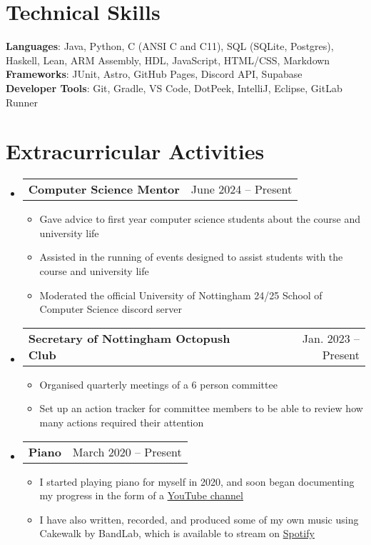 \documentclass[letterpaper,11pt]{article}
\makeatletter
\newcommand{\resumeItem}[1]{
  \item\small{
    {#1 \vspace{-2pt}}
  }
}
\newcommand{\resumeProjectHeading}[2]{
    \item
    \begin{tabular*}{0.97\textwidth}{l@{\extracolsep{\fill}}r}
      \small#1 & #2 \\
    \end{tabular*}\vspace{-7pt}
}
\newcommand{\resumeSubHeadingListStart}{\begin{itemize}[leftmargin=0.15in, label={}]}
\newcommand{\resumeSubHeadingListEnd}{\end{itemize}}
\newcommand{\resumeItemListStart}{\begin{itemize}}
\newcommand{\resumeItemListEnd}{\end{itemize}\vspace{-5pt}}
\makeatother
\begin{document}
\section{Technical Skills}
 \begin{itemize}[leftmargin=0.15in, label={}]
    \small{\item{
     \textbf{Languages}{: Java, Python, C (ANSI C and C11), SQL (SQLite, Postgres), Haskell, Lean, ARM Assembly, HDL, JavaScript, HTML/CSS, Markdown} \\
     \textbf{Frameworks}{: JUnit, Astro, GitHub Pages, Discord API, Supabase} \\
     \textbf{Developer Tools}{: Git, Gradle, VS Code, DotPeek, IntelliJ, Eclipse, GitLab Runner} \\
    }}
 \end{itemize}




\section{Extracurricular Activities}
 \resumeSubHeadingListStart
  
   \resumeProjectHeading
    {\textbf{Computer Science Mentor}}{June 2024 -- Present}
    \resumeItemListStart
        \resumeItem{Gave advice to first year computer science students about the course and university life}
        \resumeItem{Assisted in the running of events designed to assist students with the course and university life}
        \resumeItem{Moderated the official University of Nottingham 24/25 School of Computer Science discord server}
    \resumeItemListEnd
    
  \resumeProjectHeading
    {\textbf{Secretary of Nottingham Octopush Club}}{Jan. 2023 -- Present}
    \resumeItemListStart
        \resumeItem{Organised quarterly meetings of a 6 person committee}
        \resumeItem{Set up an action tracker for committee members to be able to review how many actions required their attention}
    \resumeItemListEnd

  \resumeProjectHeading
   {\textbf{Piano} }{March 2020 -- Present}
    \resumeItemListStart
        \resumeItem{I started playing piano for myself in 2020, and soon began documenting my progress in the form of a \href{https://www.youtube.com/@olisharppiano}{\underline{YouTube channel}}}
        \resumeItem{I have also written, recorded, and produced some of my own music using Cakewalk by BandLab, which is available to stream on  \href{https://open.spotify.com/artist/6LruVw10BsMoQSLqjqANQI?si=QLf49HMaT3a0i50DmHI0gQ}{\underline{Spotify}}}
    \resumeItemListEnd
   \resumeSubHeadingListEnd


\end{document}
